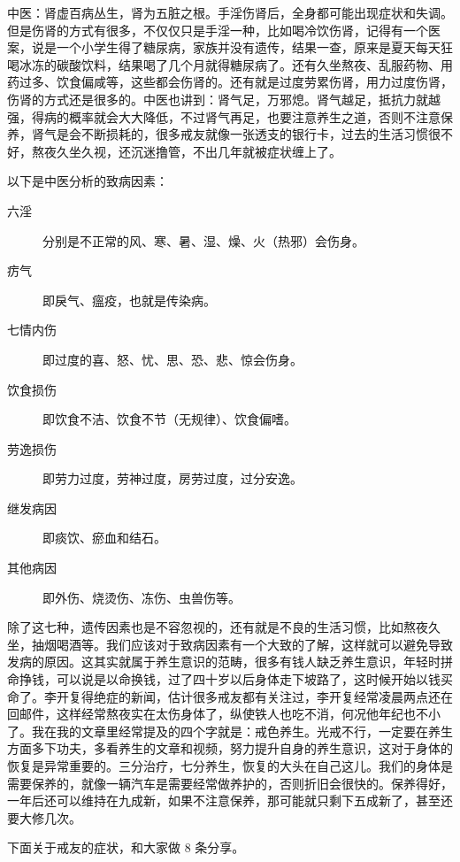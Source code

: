 中医：肾虚百病丛生，肾为五脏之根。手淫伤肾后，全身都可能出现症状和失调。但是伤肾的方式有很多，不仅仅只是手淫一种，比如喝冷饮伤肾，记得有一个医案，说是一个小学生得了糖尿病，家族并没有遗传，结果一查，原来是夏天每天狂喝冰冻的碳酸饮料，结果喝了几个月就得糖尿病了。还有久坐熬夜、乱服药物、用药过多、饮食偏咸等，这些都会伤肾的。还有就是过度劳累伤肾，用力过度伤肾，伤肾的方式还是很多的。中医也讲到：肾气足，万邪熄。肾气越足，抵抗力就越强，得病的概率就会大大降低，不过肾气再足，也要注意养生之道，否则不注意保养，肾气是会不断损耗的，很多戒友就像一张透支的银行卡，过去的生活习惯很不好，熬夜久坐久视，还沉迷撸管，不出几年就被症状缠上了。

以下是中医分析的致病因素：

\begin{description}
    \item[六淫] 分别是不正常的风、寒、暑、湿、燥、火（热邪）会伤身。
    \item[疠气] 即戾气、瘟疫，也就是传染病。
    \item[七情内伤] 即过度的喜、怒、忧、思、恐、悲、惊会伤身。
    \item[饮食损伤] 即饮食不洁、饮食不节（无规律）、饮食偏嗜。
    \item[劳逸损伤] 即劳力过度，劳神过度，房劳过度，过分安逸。
    \item[继发病因] 即痰饮、瘀血和结石。
    \item[其他病因] 即外伤、烧烫伤、冻伤、虫兽伤等。
\end{description}

除了这七种，遗传因素也是不容忽视的，还有就是不良的生活习惯，比如熬夜久坐，抽烟喝酒等。我们应该对于致病因素有一个大致的了解，这样就可以避免导致发病的原因。这其实就属于养生意识的范畴，很多有钱人缺乏养生意识，年轻时拼命挣钱，可以说是以命换钱，过了四十岁以后身体走下坡路了，这时候开始以钱买命了。李开复得绝症的新闻，估计很多戒友都有关注过，李开复经常凌晨两点还在回邮件，这样经常熬夜实在太伤身体了，纵使铁人也吃不消，何况他年纪也不小了。我在我的文章里经常提及的四个字就是：戒色养生。光戒不行，一定要在养生方面多下功夫，多看养生的文章和视频，努力提升自身的养生意识，这对于身体的恢复是异常重要的。三分治疗，七分养生，恢复的大头在自己这儿。我们的身体是需要保养的，就像一辆汽车是需要经常做养护的，否则折旧会很快的。保养得好，一年后还可以维持在九成新，如果不注意保养，那可能就只剩下五成新了，甚至还要大修几次。

下面关于戒友的症状，和大家做 8 条分享。

